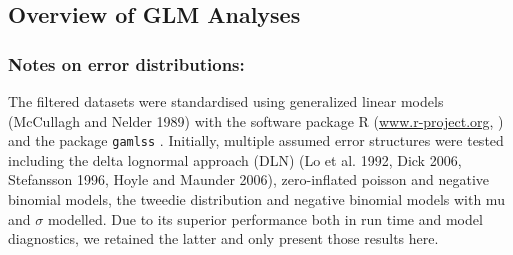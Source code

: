                                                                                        
                                                                                       
   \subsection{Overview of GLM Analyses}
   \subsubsection{Notes on error distributions:} 
  
   The  filtered datasets  were standardised using generalized linear models (McCullagh and Nelder 1989) with the software package R (\url{www.r-project.org}, \citealt{RCT2013_a}) and the package \texttt{gamlss} \citep{Rigby2006_a}. Initially, multiple assumed error structures were tested including the delta lognormal approach (DLN) (Lo et al. 1992, Dick 2006, Stefansson 1996, Hoyle and Maunder 2006), zero-inflated poisson and negative binomial models, the tweedie distribution \citep{Shono2008} and negative binomial models with mu and  $\sigma$ modelled. Due to its superior performance both in run time and model diagnostics, we retained the latter and only present those results here.

